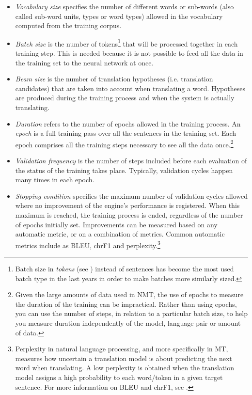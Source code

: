 \documentclass[output=paper]{langscibook}
\begin{document}
\begin{itemize}

\item \textit{Vocabulary size} specifies the number of different words or sub-words (also called  sub-word units, types or word types) allowed in the vocabulary computed from the training corpus.  

\item \textit{Batch size} is the number of tokens\footnote{Batch size in \textit{tokens} (see ) instead of sentences has become the most used batch type in the last years in order to make batches more similarly sized.} that will be processed together in each training step. This is needed because it is not possible to feed all the data in the training set to the neural network at once.

\item \textit{Beam size} is the number of translation hypotheses (i.e. translation candidates) that are taken into account when translating a word. Hypotheses are produced during the training process and when the system is actually translating. 

\item \textit{Duration} refers to the number of epochs allowed in the training process. An \textit{epoch} is a full training pass over all the sentences in the training set. Each epoch comprises all the training steps necessary to see all the data once.\footnote{Given the large amounts of data  used in NMT, the use of epochs to measure the duration of the training can be impractical. Rather than using epochs, you can use the number of steps, in relation to a particular batch size, to help you measure duration  independently of the model, language pair or amount of data.} 

\item \textit{Validation frequency} is the number of steps included before each evaluation of the status of the training takes place. Typically, validation cycles happen many times in each epoch.

\item \textit{Stopping condition} specifies the maximum number of validation cycles allowed where no improvement of the engine's performance is registered. When this maximum is reached, the training process is ended, regardless of the number of epochs initially set. Improvements can be measured based on any automatic metric, or on a combination of metrics. Common automatic metrics include as BLEU, chrF1 and perplexity.\footnote{Perplexity in natural language processing, and more specifically in MT, measures how uncertain a translation model is about predicting the next word when translating. A low perplexity is obtained when the translation model assigns a high probability to each word/token in a given target sentence. For more information on BLEU and chrF1, see .}
\end{itemize}
\end{document}
